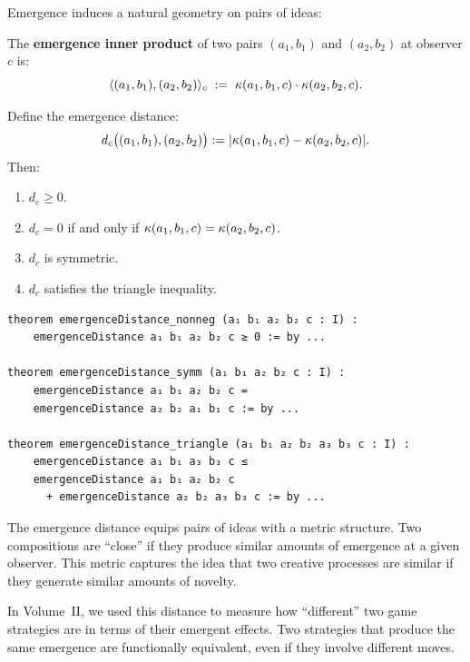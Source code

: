 Emergence induces a natural geometry on pairs of ideas:

\begin{definition}
\label{def:emergence-inner-product}
The \textbf{emergence inner product} of two pairs $(a_1, b_1)$ and $(a_2, b_2)$
at observer $c$ is:
\[
  \langle (a_1, b_1), (a_2, b_2) \rangle_c
  \;:=\; \kappa(a_1, b_1, c) \cdot \kappa(a_2, b_2, c).
\]
\end{definition}

\begin{theorem}
\label{thm:emergence-distance}
Define the emergence distance:
\[
  d_c\bigl((a_1, b_1), (a_2, b_2)\bigr) := |\kappa(a_1, b_1, c) - \kappa(a_2, b_2, c)|.
\]
Then:
\begin{enumerate}
  \item $d_c \geq 0$.
  \item $d_c = 0$ if and only if $\kappa(a_1, b_1, c) = \kappa(a_2, b_2, c)$.
  \item $d_c$ is symmetric.
  \item $d_c$ satisfies the triangle inequality.
\end{enumerate}
\end{theorem}

\begin{lstlisting}[caption={Emergence distance (IDT\_v3\_Emergence.lean)}]
theorem emergenceDistance_nonneg (a₁ b₁ a₂ b₂ c : I) :
    emergenceDistance a₁ b₁ a₂ b₂ c ≥ 0 := by ...

theorem emergenceDistance_symm (a₁ b₁ a₂ b₂ c : I) :
    emergenceDistance a₁ b₁ a₂ b₂ c =
    emergenceDistance a₂ b₂ a₁ b₁ c := by ...

theorem emergenceDistance_triangle (a₁ b₁ a₂ b₂ a₃ b₃ c : I) :
    emergenceDistance a₁ b₁ a₃ b₃ c ≤
    emergenceDistance a₁ b₁ a₂ b₂ c
      + emergenceDistance a₂ b₂ a₃ b₃ c := by ...
\end{lstlisting}

\begin{interpretation}
The emergence distance equips pairs of ideas with a metric structure. Two
compositions are ``close'' if they produce similar amounts of emergence at a
given observer. This metric captures the idea that two creative processes are
similar if they generate similar amounts of novelty.

In Volume~II, we used this distance to measure how ``different'' two game
strategies are in terms of their emergent effects. Two strategies that produce
the same emergence are functionally equivalent, even if they involve different
moves.
\end{interpretation}


